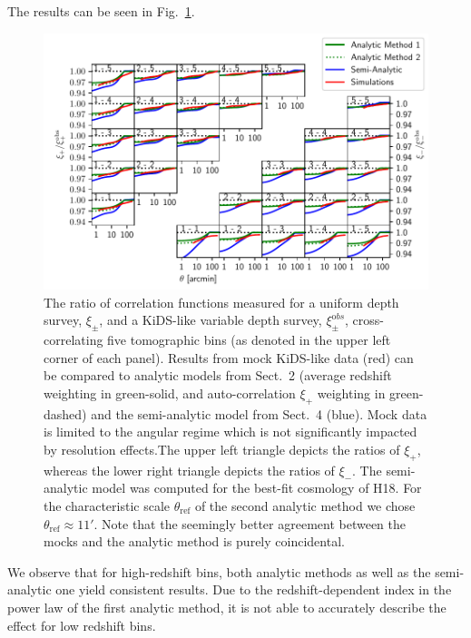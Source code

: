 \documentclass{aa}
\renewcommand{\rm}{\mathrm}
\begin{document}
The results can be seen in Fig.~\ref{fig:all_xis}.
  \begin{figure}
  \centering
  \includegraphics[width=0.9\linewidth]{images/xis_all1.pdf}
  \caption{The ratio of correlation functions measured for a uniform depth survey, $\xi_\pm$, and a KiDS-like variable depth survey, $\xi_\pm^{\rm obs}$, cross-correlating five tomographic bins (as denoted in the upper left corner of each panel). Results from mock KiDS-like data (red) can be compared to analytic models from Sect.~2 (average redshift weighting in green-solid, and auto-correlation $\xi_+$ weighting in green-dashed) and the semi-analytic model from Sect.~4 (blue). Mock data is limited to the angular regime which is not significantly impacted by resolution effects.The upper left triangle depicts the ratios of $\xi_+$, whereas the lower right triangle depicts the ratios of $\xi_-$. The semi-analytic model was computed for the best-fit cosmology of H18. For the characteristic scale $\theta_{\rm{ref}}$ of the second analytic method we chose $\theta_{\rm{ref}} \approx 11'$. Note that the seemingly better agreement between the mocks and the analytic method is purely coincidental.}
  \label{fig:all_xis}
  \end{figure}
We observe that for high-redshift bins, both analytic methods as well as the semi-analytic one yield consistent results. Due to the redshift-dependent index in the power law of the first analytic method, it is not able to accurately describe the effect for low redshift bins. 
\end{document}

